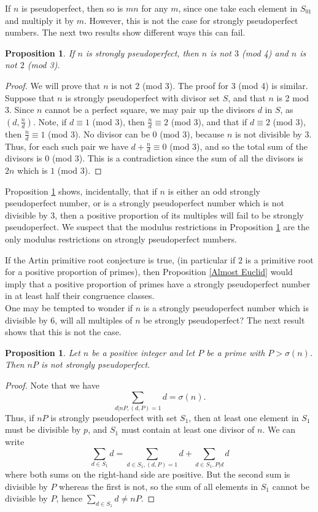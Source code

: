 \documentclass{article}
\newtheorem{proposition}[theorem]{Proposition}
\begin{document}
If $n$ is pseudoperfect, then so is $mn$ for any $m$, since one take each element in $S_01$  and multiply it by $m$. However, this is not the case for strongly pseudoperfect numbers. The next two results show different ways this can fail.

\begin{proposition} If $n$ is strongly pseudoperfect, then $n$ is not $3$ (mod 4) and $n$ is not $2$ (mod 3). \label{strong pseudos satisfy Touchard}
\end{proposition}
\begin{proof} We will prove that $n$ is not 2 (mod 3). The proof for $3$ (mod 4) is similar. Suppose that $n$ is strongly pseudoperfect with divisor set $S$, and that $n$ is 2 mod 3. Since $n$ cannot be a perfect square, we may pair up the divisors $d$ in $S$, as $(d, \frac{n}{d})$. Note, if $d \equiv 1$ (mod 3), then $\frac{n}{d} \equiv 2$ (mod 3), and that if $d \equiv 2$ (mod 3), then $\frac{n}{d} \equiv 1$ (mod 3). No divisor can be $0$ (mod 3), because $n$ is not divisible by $3$.  Thus, for each such pair we have $d+ \frac{n}{d} \equiv 0$ (mod 3), and so the total sum of the divisors is $0$ (mod 3). This is a contradiction since the sum of all the divisors is $2n$ which is $1$ (mod 3).
\end{proof}

Proposition \ref{strong pseudos satisfy Touchard} shows, incidentally, that if $n$ is either an odd strongly pseudoperfect number, or is a strongly pseudoperfect number which is not divisible by 3, then a positive proportion of its multiples will fail to be strongly pseudoperfect. We suspect that the modulus restrictions in Proposition \ref{strong pseudos satisfy Touchard} are the only modulus restrictions on strongly pseudoperfect numbers. 

If the Artin primitive root conjecture is true, (in particular if $2$ is a primitive root for a positive proportion of primes), then Proposition \ref{Almost Euclid} would imply that a positive proportion of primes have a strongly pseudoperfect number in at least half their congruence classes.\\
One may be tempted to wonder if $n$ is a strongly pseudoperfect number which is divisible by 6, will all multiples of $n$  be strongly pseudoperfect? The next result shows that this is not the case.

\begin{proposition} Let  $n$ be a positive integer and let $P$ be a prime with $P> \sigma(n)$. Then $nP$ is not strongly pseudoperfect. \label{big class of non- strongly pseudoperfect}
\end{proposition}
\begin{proof} Note that we have $$\sum_{d|nP, (d,P)= 1}d = \sigma(n).$$ Thus, if $nP$ is strongly pseudoperfect with set $S_1$, then at least one element in $S_1$ must be divisible by $p$, and $S_1$ must contain at least one divisor of $n$. We can write 
$$\sum_{d \in S_1} d = \sum_{d \in S_1, (d,P)=1} d + \sum_{d \in S_1, P|d}d $$ where both sums on the right-hand side are positive. But the second sum is divisible by $P$ whereas the first is not, so the sum of all elements in $S_1$ cannot be divisible by $P$, hence $\sum_{d \in S_1} d \neq nP.$   
\end{proof}
\end{document}
